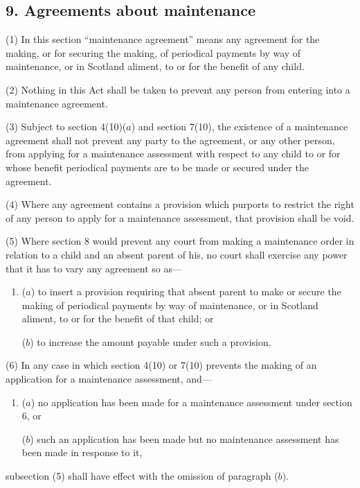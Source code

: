 \documentclass[12pt,a4paper]{article}
\begin{document}

\subsection{9. Agreements about maintenance}

(1) In this section “maintenance agreement” means any agreement for the making, or for securing the making, of periodical payments by way of maintenance, or in Scotland aliment, to or for the benefit of any child.

(2) Nothing in this Act shall be taken to prevent any person from entering into a maintenance agreement.

(3) 
Subject to section 4(10)($a$) and section 7(10),  %
the existence of a maintenance agreement shall not prevent any party to the agreement, or any other person, from applying for a maintenance assessment with respect to any child to or for whose benefit periodical payments are to be made or secured under the agreement.

(4) Where any agreement contains a provision which purports to restrict the right of any person to apply for a maintenance assessment, that provision shall be void.

(5) Where section 8 would prevent any court from making a maintenance order in relation to a child and an absent parent of his, no court shall exercise any power that it has to vary any agreement so as—
\begin{enumerate}\item[]
($a$) to insert a provision requiring that absent parent to make or secure the making of periodical payments by way of maintenance, or in Scotland aliment, to or for the benefit of that child; or

($b$) to increase the amount payable under such a provision.
\end{enumerate}

(6) In any case in which section 4(10) or 7(10) prevents the making of an application for a maintenance assessment, and—
\begin{enumerate}\item[]
($a$) no application has been made for a maintenance assessment under section 6, or

($b$) such an application has been made but no maintenance assessment has been made in response to it,
\end{enumerate}
subsection (5) shall have effect with the omission of paragraph ($b$).
\end{document}
